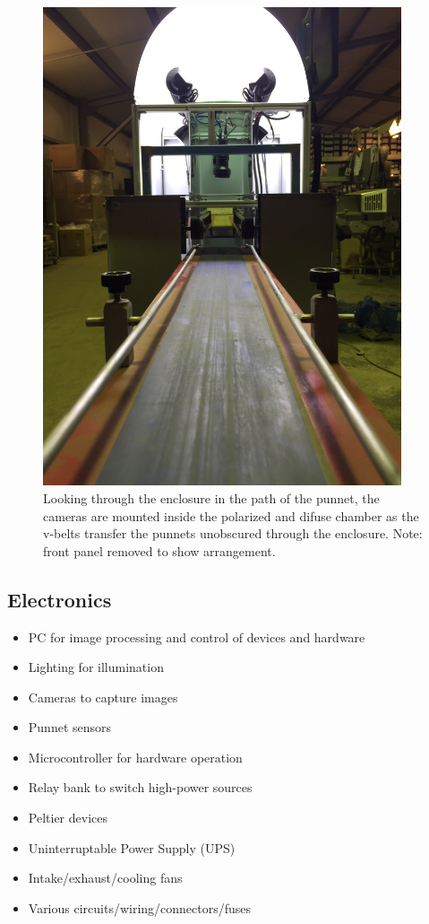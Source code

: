 \documentclass[fleqn,twoside]{article}
\begin{document}
\begin{figure}[h]
	\centering
	\includegraphics[width=300pt]{images/enclosure_3.jpg}
	\caption{Looking through the enclosure in the path of the punnet, the cameras are mounted inside the polarized and difuse chamber as the v-belts transfer the punnets unobscured through the enclosure. Note: front panel removed to show arrangement.}
	\label{fig:enclosure_3}
\end{figure}





\subsection{Electronics}



\begin{itemize}
	\item PC for image processing and control of devices and hardware
	\item Lighting for illumination
	\item Cameras to capture images
	\item Punnet sensors
	\item Microcontroller for hardware operation
	\item Relay bank to switch high-power sources
	\item Peltier devices
	\item Uninterruptable Power Supply (UPS)
	\item Intake/exhaust/cooling fans
	\item Various circuits/wiring/connectors/fuses
\end{itemize} 
\end{document}
